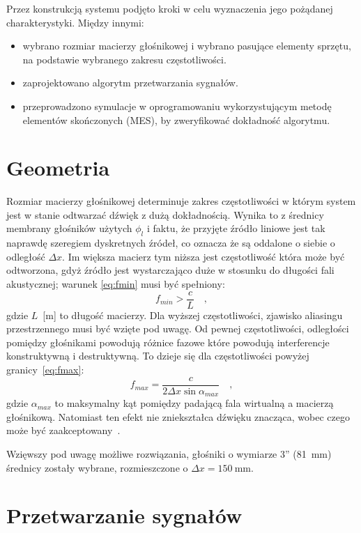 \documentclass[12pt]{oska}
\begin{document}
Przez konstrukcją systemu podjęto kroki w celu wyznaczenia jego pożądanej
charakterystyki. Między innymi:
\begin{itemize}
  \item wybrano rozmiar macierzy głośnikowej i wybrano pasujące elementy
    sprzętu, na podstawie wybranego zakresu częstotliwości.
  \item zaprojektowano algorytm przetwarzania sygnałów.
  \item przeprowadzono symulacje w oprogramowaniu wykorzystującym metodę
    elementów skończonych (MES), by zweryfikować dokładność algorytmu.
\end{itemize}

\section{Geometria}

Rozmiar macierzy głośnikowej determinuje zakres częstotliwości w którym system
jest w stanie odtwarzać dźwięk z dużą dokładnością. Wynika to z średnicy
membrany głośników użytych $\phi_l$ i faktu, że przyjęte źródło liniowe jest
tak naprawdę szeregiem dyskretnych źródeł, co oznacza że są oddalone o siebie o
odległość $\Delta x$. Im większa macierz tym niższa jest częstotliwość która
może być odtworzona, gdyż źródło jest wystarczająco duże w stosunku do długości
fali akustycznej; warunek \eqref{eq:fmin} musi być spełniony:
\begin{equation}
  f_{min}>\frac{c}{L} \quad,	\label{eq:fmin}
\end{equation}
gdzie $L$~[m] to długość macierzy. Dla wyższej częstotliwości, zjawisko
aliasingu przestrzennego musi być wzięte pod uwagę. Od pewnej częstotliwości,
odległości pomiędzy głośnikami powodują różnice fazowe które powodują
interferencje konstruktywną i destruktywną. To dzieje się dla częstotliwości
powyżej granicy~\eqref{eq:fmax}:
\begin{equation}
  f_{max}=\frac{c}{2\Delta x \sin{\alpha_{max}}} \quad, \label{eq:fmax}
\end{equation}
gdzie $\alpha_{max}$ to maksymalny kąt pomiędzy padającą fala wirtualną a
macierzą głośnikową. Natomiast ten efekt nie zniekształca dźwięku znacząca,
wobec czego może być zaakceptowany~\cite{hq_rendering}.

Wzięwszy pod uwagę możliwe rozwiązania, głośniki o wymiarze 3''
(\SI{81}{\milli\meter}) średnicy zostały wybrane, rozmieszczone o
$\Delta x=\SI{150}{\milli\meter}$.

\section{Przetwarzanie sygnałów}\label{s:algorithm}
\end{document}

